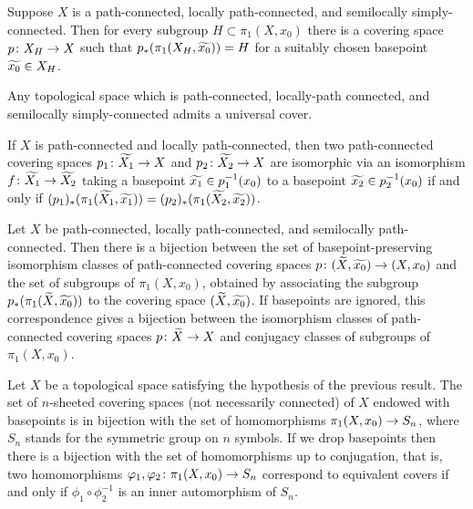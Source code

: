 \begin{proposition}
  Suppose $X$ is a path-connected, locally path-connected, and semilocally simply-connected. Then for every subgroup $H \subset \pi_1(X,x_0)$ there is a covering space $p \colon X_H \rightarrow X$ such that $p_\ast(\pi_1(X_H,\widetilde{x_0})) = H$ for a suitably chosen basepoint $\widetilde{x_0} \in X_H$.
\end{proposition}

\begin{corollary}
  Any topological space which is path-connected, locally-path connected, and semilocally simply-connected admits a universal cover.
\end{corollary}

\begin{proposition}
  If $X$ is path-connected and locally path-connected, then two path-connected covering spaces $p_1 \colon \widetilde{X_1} \rightarrow X$ and $p_2 \colon \widetilde{X_2} \rightarrow X$ are isomorphic via an isomorphism $f \colon \widetilde{X_1} \rightarrow \widetilde{X_2}$ taking a basepoint $\widetilde{x_1} \in p_1^{-1}(x_0)$ to a basepoint $\widetilde{x_2} \in p_2^{-1}(x_0)$ if and only if $(p_1)_\ast(\pi_1(\widetilde{X_1}, \widetilde{x_1})) = (p_2)_\ast(\pi_1(\widetilde{X_2}, \widetilde{x_2}))$.
\end{proposition}

\begin{theorem}
  Let $X$ be path-connected, locally path-connected, and semilocally path-connected. Then there is a bijection between the set of basepoint-preserving isomorphism classes of path-connected covering spaces $p \colon (\widetilde{X},\widetilde{x_0}) \rightarrow (X,x_0)$ and the set of subgroups of $\pi_1(X,x_0)$, obtained by associating the subgroup $p_\ast(\pi_1(\widetilde{X},\widetilde{x_0}))$ to the covering space $(\widetilde{X},\widetilde{x_0})$. If basepoints are ignored, this correspondence gives a bijection between the isomorphism classes of path-connected covering spaces $p \colon \widetilde{X} \rightarrow X$ and conjugacy classes of subgroups of $\pi_1(X,x_0)$.
\end{theorem}

\begin{theorem}
  Let $X$ be a topological space satisfying the hypothesis of the previous result. The set of $n$-sheeted covering spaces (not necessarily connected) of $X$ endowed with basepoints is in bijection with the set of homomorphisms $\pi_1(X,x_0) \rightarrow S_n$, where $S_n$ stands for the symmetric group on $n$ symbols. If we drop basepoints then there is a bijection with the set of homomorphisms up to conjugation, that is, two homomorphisms $\varphi_1, \varphi_2 \colon \pi_1(X,x_0) \rightarrow S_n$ correspond to equivalent covers if and only if $\phi_1 \circ \phi_2^{-1}$ is an inner automorphism of $S_n$.
\end{theorem}

